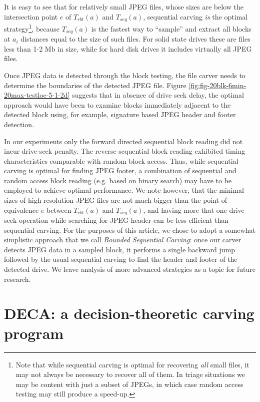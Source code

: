 \documentclass[final,5p,times,twocolumn,authoryear]{elsarticle}
\begin{document}
It is easy to see that for relatively small JPEG files, whose sizes are below the intersection point $e$ of $T_{rbt}(a)$ and $T_{seq}(a)$, sequential carving \emph{is} the optimal strategy\footnote{Note that while sequential carving is optimal for recovering \emph{all} small files, it may not always be necessary to recover all of them. In triage situations we may be content with just a subset of JPEGs, in which case random access testing may still produce a speed-up.}, because $T_{seq}(a)$ is the fastest way to ``sample'' and extract all blocks at $a_i$ distances equal to the size of such files. For solid state drives these are files less than 1-2 Mb in size, while for hard disk drives it includes virtually all JPEG files.

Once JPEG data is detected through the block testing, the file carver needs to determine the boundaries of the detected JPEG file. Figure \ref{fig:fig-20blk-6min-20max-testloc-5-1-2d} suggests that in absence of drive seek delay, the optimal approach would have been to examine blocks immediately adjacent to the detected block using, for example, signature based JPEG header and footer detection. 

In our experiments only the forward directed sequential block reading did not incur drive-seek penalty. The reverse sequential block reading exhibited timing characteristics comparable with random block access.  Thus, while sequential carving is optimal for finding JPEG footer, a combination of sequential and random access block reading (e.g. based on binary search) may have to be employed to achieve optimal performance. We note however, that the minimal sizes of high resolution JPEG files are not much bigger than the point of equivalence $e$ between $T_{rbt}(a)$ and $T_{seq}(a)$, and having more that one drive seek operation while searching for JPEG header can be less efficient than sequential carving. For the purposes of this article, we chose to adopt a somewhat simplistic approach that we call \emph{Bounded Sequential Carving}: once our carver detects JPEG data in a sampled block, it performs a single backward jump followed by the usual sequential carving to find the header and footer of the detected drive. We leave analysis of more advanced strategies as a topic for future research.

\section{DECA: a decision-theoretic carving program}
\end{document}
